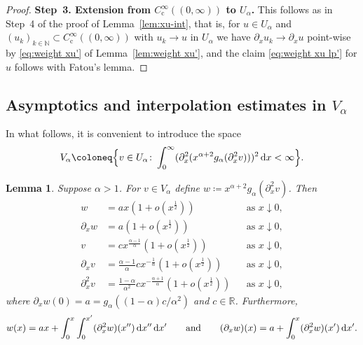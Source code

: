 \documentclass[reqno,12pt]{amsart}
\renewcommand{\d}{\ensuremath{\mathrm{d}}}
\newcommand{\R}{\ensuremath{\mathbb{R}}}
\newcommand{\N}{\ensuremath{\mathbb{N}}}
\renewcommand{\d}{\ensuremath{{\rm d}}}
\newtheorem{lemma}[theorem]{Lemma}
\numberwithin{equation}{section}
\begin{document}
\begin{proof}
%
\bigskip
%

\noindent\textbf{Step~3. Extension from $C^\infty_\mathrm{c}((0,\infty))$ to $U_\alpha$.}
This follows as in Step~4 of the proof of Lemma~\ref{lem:xu-int}, that is, for $u \in U_\alpha$ and $(u_k)_{k \in \N} \subset C^\infty_\mathrm{c}((0,\infty))$
with $u_k \to u$ in $U_\alpha$ we have $\partial_x u_k \to \partial_x u$ point-wise by \eqref{eq:weight xu'} of Lemma~\ref{lem:weight xu'}, and the claim \eqref{eq:weight xu lp'} for $u$ follows with Fatou's lemma.
\end{proof}
%

%
\subsection{Asymptotics and interpolation estimates in $V_\alpha$}
\label{sec:valpha}
%
In what follows, it is convenient to introduce the space
%
\begin{equation}\label{def-valpha}
V_\alpha \coloneq \Big\{v \in U_\alpha \colon \int_0^\infty (\partial_x^2 (x^{\alpha+2} g_\alpha(\partial_x^2 v)))^2 \, \d x < \infty\Big\}.
\end{equation}
%

%
\begin{lemma}\label{lem-valpha}
Suppose $\alpha > 1$. For $v \in V_\alpha$ define $w \coloneq x^{\alpha+2} g_\alpha(\partial_x^2 v)$. Then
%
\begin{subequations}\label{asymptotic-vw}
\begin{align}
w &= a x (1+o(x^{\frac 1 2})) && \text{as } x \downarrow 0, \label{as-w} \\
\partial_x w &= a (1+o(x^{\frac 1 2})) && \text{as } x \downarrow 0, \label{as-dxw} \\
v &= c x^{\frac{\alpha-1}\alpha} (1+o(x^{\frac 1 2})) && \text{as } x \downarrow 0, \label{as-d2xw} \\
\partial_x v &= \frac{\alpha-1}{\alpha} c x^{-\frac 1 \alpha} (1+o(x^{\frac 1 2})) && \text{as } x \downarrow 0, \\
\partial_x^2 v &= \frac{1-\alpha}{\alpha^2} c x^{- \frac{\alpha+1}{\alpha}} (1+o(x^{\frac 1 2})) && \text{as } x \downarrow 0,
\end{align}
\end{subequations}
%
where $\partial_x w(0) = a = g_\alpha((1-\alpha) c/\alpha^2)$ and $c \in \R$. Furthermore,
%
\begin{equation}\label{fundamental-w}
w(x) = a x + \int_0^x \int_0^{x'} (\partial_x^2 w)(x'') \, \d x'' \, \d x' \qquad \text{and} \qquad (\partial_x w)(x) = a + \int_0^x (\partial_x^2 w)(x') \, \d x'.
\end{equation}
%
\end{lemma}
%
\end{document}
